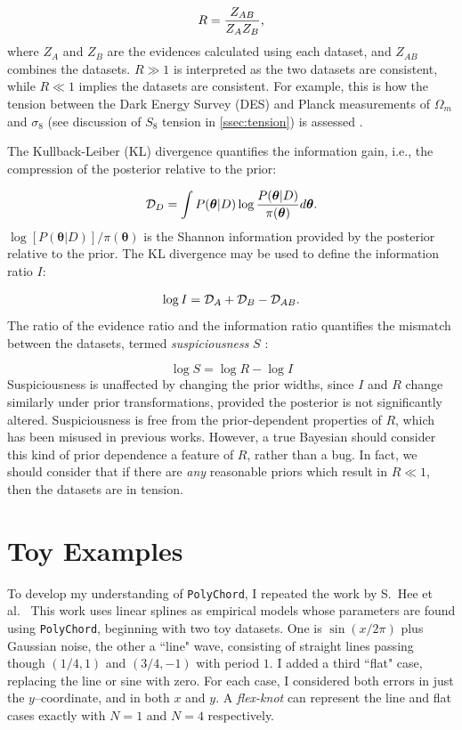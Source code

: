 \documentclass{article}
\begin{document}
\begin{equation}
  R = \frac{Z_{AB}}{Z_A Z_B} \textrm,
\end{equation}
%
where $Z_A$ and $Z_B$ are the evidences calculated using each dataset, and $Z_{AB}$ combines the datasets. $R\gg1$ is interpreted as the two datasets are consistent, while $R\ll1$ implies the datasets are consistent. For example, this is how the tension between the Dark Energy Survey (DES) and Planck measurements of $\Omega_m$ and $\sigma_8$ (see discussion of $S_8$ tension in \ref{ssec:tension}) is assessed \cite{suspiciousness}. 

The Kullback-Leiber (KL) divergence quantifies the information gain, i.e., the compression of the posterior relative to the prior:

\begin{equation}
  \mathcal D_D = \int P(\bm\theta | D) \log{\frac{P(\bm\theta | D)}{\pi(\bm\theta)}}d\bm\theta \textrm.
\end{equation}
%
$\log{[P(\bm\theta | D)]/\pi(\bm\theta)}$ is the Shannon information \cite{shannon} provided by the posterior relative to the prior. The KL divergence may be used to define the information ratio $I$:

\begin{equation}
  \log{I} = \mathcal D_A + \mathcal D_B - \mathcal D_{AB} \textrm.
\end{equation}
%
The ratio of the evidence ratio and the information ratio quantifies the mismatch between the datasets, termed \textit{suspiciousness} $S$ \cite{suspiciousness}:

\begin{equation}
  \log{S} = \log{R} - \log{I}
\end{equation}
%
 Suspiciousness is unaffected by changing the prior widths, since $I$ and $R$ change similarly under prior transformations, provided the posterior is not significantly altered. Suspiciousness is free from the prior-dependent properties of $R$, which has been misused in previous works. However, a true Bayesian should consider this kind of prior dependence a feature of $R$, rather than a bug. In fact, we should consider that if there are \textit{any} reasonable priors which result in $R\ll1$, then the datasets are in tension.

\section{Toy Examples}
\label{toyexamples}
To develop my understanding of \texttt{PolyChord}, I repeated the work by S.~Hee et al.\ \cite{Sonke} This work uses linear splines as empirical models whose parameters are found using \texttt{PolyChord}, beginning with two toy datasets. One is $\sin\left({x/2\pi}\right)$ plus Gaussian noise, the other a ``line" wave, consisting of straight lines passing though $(1/4, 1)$ and $(3/4, -1)$ with period $1$. I added a third ``flat" case, replacing the line or sine with zero. For each case, I considered both errors in just the $y$--coordinate, and in both $x$ and $y$. A \textit{flex-knot} can represent the line and flat cases exactly with $N=1$ and $N=4$ respectively.
\end{document}
